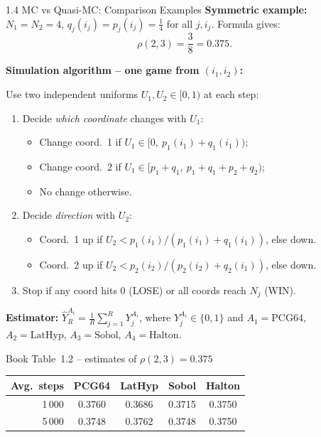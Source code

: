 \documentclass[aspectratio=169,10pt]{beamer}
\begin{document}
\begin{frame}[allowframebreaks]{1.4 MC vs Quasi-MC: Comparison Examples}
  \textbf{Symmetric example:}
  $N_1 = N_2 = 4$,
  $q_j(i_j) = p_j(i_j) = \tfrac{1}{4}$ for all $j, i_j$.
  Formula gives:
  \[
    \rho(2,3) = \frac{3}{8} = 0.375.
  \]

  \framebreak

  \textbf{Simulation algorithm -- one game from $(i_1,i_2)$:}

  Use two independent uniforms $U_1, U_2 \in [0,1)$ at each step:
  \begin{enumerate}
    \item Decide \emph{which coordinate} changes with $U_1$:
      \begin{itemize}
        \item Change coord.~1 if $U_1 \in [0,\ p_1(i_1)+q_1(i_1))$;
        \item Change coord.~2 if $U_1 \in [p_1+q_1,\ p_1+q_1+p_2+q_2)$;
        \item No change otherwise.
      \end{itemize}
    \item Decide \emph{direction} with $U_2$:
      \begin{itemize}
        \item Coord.~1 up if $U_2 < p_1(i_1)/(p_1(i_1)+q_1(i_1))$, else down.
        \item Coord.~2 up if $U_2 < p_2(i_2)/(p_2(i_2)+q_2(i_1))$, else down.
      \end{itemize}
    \item Stop if any coord hits 0 (LOSE) or all coords reach $N_j$ (WIN).
  \end{enumerate}

  \textbf{Estimator:}
  $\hat{Y}_R^{A_i} = \frac{1}{R}\sum_{j=1}^{R} Y_j^{A_i}$,
  where $Y_j^{A_i}\in\{0,1\}$ and
  $A_1=\text{PCG64}$, $A_2=\text{LatHyp}$, $A_3=\text{Sobol}$,
  $A_4=\text{Halton}$.

  \framebreak

  \begin{block}{Book Table~1.2 -- estimates of $\rho(2,3) = 0.375$}
    \centering
    \begin{tabular}{rcccc}
      \toprule
      Avg.\ steps & PCG64 & LatHyp & Sobol & Halton \\
      \midrule
      1\,000 & 0.3760 & 0.3686 & 0.3715 & 0.3750 \\
      5\,000 & 0.3748 & 0.3762 & 0.3748 & 0.3750 \\
      \bottomrule
    \end{tabular}
  \end{block}


\end{frame}
\end{document}
